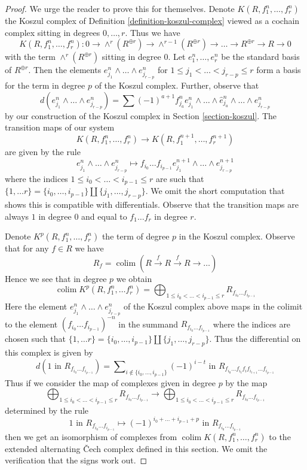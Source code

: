 \documentclass[10pt,a4paper]{amsart}
\theoremstyle{plain}
\theoremstyle{definition}
\theoremstyle{remark}
\numberwithin{equation}{subsection}
\def\colim{\mathop{\mathrm{colim}}\nolimits}
\begin{document}
\begin{proof}
We urge the reader to prove this for themselves.
Denote $K(R, f_1^n, \ldots, f_r^n)$ the Koszul complex of
Definition \ref{definition-koszul-complex} viewed as a cochain complex
sitting in degrees $0, \ldots, r$. Thus we have
$$
K(R, f_1^n, \ldots, f_r^n) :
0 \to \wedge^r(R^{\oplus r}) \to
\wedge^{r - 1}(R^{\oplus r}) \to \ldots \to
R^{\oplus r} \to R \to 0
$$
with the term $\wedge^r(R^{\oplus r})$ sitting in degree $0$.
Let $e^n_1, \ldots, e^n_r$ be the standard basis of $R^{\oplus r}$.
Then the elements $e^n_{j_1} \wedge \ldots \wedge e^n_{j_{r - p}}$ for
$1 \leq j_1 < \ldots < j_{r - p} \leq r$ form a basis for the term in
degree $p$ of the Koszul complex. Further, observe that
$$
d(e^n_{j_1} \wedge \ldots \wedge e^n_{j_{r - p}}) =
\sum (-1)^{a + 1} f_{j_a}^n e^n_{j_1} \wedge \ldots \wedge \hat e^n_{j_a} \wedge
\ldots \wedge e^n_{j_{r - p}}
$$
by our construction of the Koszul complex in Section \ref{section-koszul}.
The transition maps of our system
$$
K(R, f_1^n, \ldots, f_r^n) \to K(R, f_1^{n + 1}, \ldots, f_r^{n + 1})
$$
are given by the rule
$$
e^n_{j_1} \wedge \ldots \wedge e^n_{j_{r - p}}
\longmapsto
f_{i_0} \ldots f_{i_{p - 1}}
e^{n + 1}_{j_1} \wedge \ldots \wedge e^{n + 1}_{j_{r - p}}
$$
where the indices $1 \leq i_0 < \ldots < i_{p - 1} \leq r$ are such that
$\{1, \ldots r\} =
\{i_0, \ldots, i_{p - 1}\} \amalg \{j_1, \ldots, j_{r - p}\}$.
We omit the short computation that shows this is compatible with differentials.
Observe that the transition maps are always $1$ in degree $0$
and equal to $f_1 \ldots f_r$ in degree $r$.

\medskip\noindent
Denote $K^p(R, f_1^n, \ldots, f_r^n)$ the term of degree $p$ in the Koszul
complex. Observe that for any $f \in R$ we have
$$
R_f = \colim (R \xrightarrow{f} R \xrightarrow{f} R \to \ldots )
$$
Hence we see that in degree $p$ we obtain
$$
\colim K^p(R, f_1^n, \ldots f_r^n) =
\bigoplus\nolimits_{1 \leq i_0 < \ldots < i_{p - 1} \leq r}
R_{f_{i_0} \ldots f_{i_{p - 1}}}
$$
Here the element $e^n_{j_1} \wedge \ldots \wedge e^n_{j_{r - p}}$
of the Koszul complex above maps in the colimit
to the element $(f_{i_0} \ldots f_{i_{p - 1}})^{-n}$ in the
summand $R_{f_{i_0} \ldots f_{i_{p - 1}}}$
where the indices are chosen such that
$\{1, \ldots r\} = \{i_0, \ldots, i_{p - 1}\}
\amalg \{j_1, \ldots, j_{r - p}\}$.
Thus the differential on this complex is given by
$$
d(1\text{ in }R_{f_{i_0} \ldots f_{i_{p - 1}}}) =
\sum\nolimits_{i \not \in \{i_0, \ldots, i_{p - 1}\}}
(-1)^{i - t}\text{ in }
R_{f_{i_0} \ldots f_{i_t} f_i f_{i_{t + 1}} \ldots f_{i_{p - 1}}}
$$
Thus if we consider the map of complexes given in degree $p$
by the map
$$
\bigoplus\nolimits_{1 \leq i_0 < \ldots < i_{p - 1} \leq r}
R_{f_{i_0} \ldots f_{i_{p - 1}}}
\longrightarrow
\bigoplus\nolimits_{1 \leq i_0 < \ldots < i_{p - 1} \leq r}
R_{f_{i_0} \ldots f_{i_{p - 1}}}
$$
determined by the rule
$$
1\text{ in }R_{f_{i_0} \ldots f_{i_{p - 1}}}
\longmapsto
(-1)^{i_0 + \ldots + i_{p - 1} + p}\text{ in }R_{f_{i_0} \ldots f_{i_{p - 1}}}
$$
then we get an isomorphism of complexes from
$\colim K(R, f_1^n, \ldots, f_r^n)$ to the
extended alternating {\v C}ech complex defined in this section.
We omit the verification that the signs work out.
\end{proof}
\end{document}
